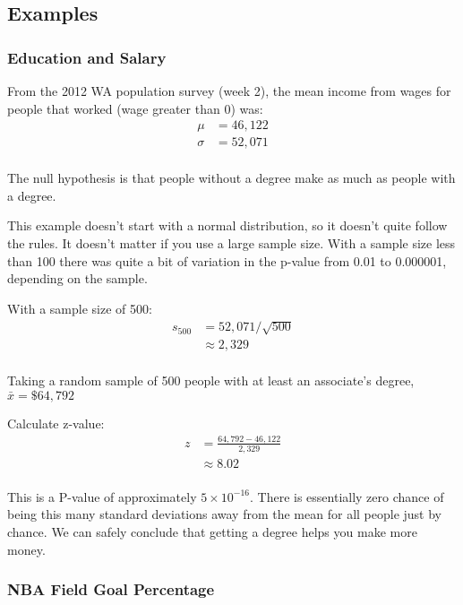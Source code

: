 \documentclass[letterpaper, landscape]{exam}
\begin{document}
  \subsection{Examples}

  \subsubsection{Education and Salary}

  From the 2012 WA population survey (week 2), the mean income from wages for
  people that worked (wage greater than 0) was:
  \begin{align*}
    \mu    & = 46,122 \\
    \sigma & = 52,071 \\
  \end{align*}

  The null hypothesis is that people without a degree make as much as people
  with a degree.

  This example doesn't start with a normal distribution, so it doesn't quite
  follow the rules. It doesn't matter if you use a large sample size. With a
  sample size less than 100 there was quite a bit of variation in the p-value
  from 0.01 to 0.000001, depending on the sample.

  With a sample size of 500:
  \begin{align*}
    s_{500} & = 52,071 / \sqrt{500} \\
                     & \approx 2,329 \\
  \end{align*}

  Taking a random sample of 500 people with at least an associate's degree, 
  $\bar{x} = \$64,792$

  Calculate z-value:
  \begin{align*}
    z & = \frac{64,792 - 46,122}{2,329} \\
      & \approx 8.02 \\
  \end{align*}

  This is a P-value of approximately $5 \times 10^{-16}$. There is essentially
  zero chance of being this many standard deviations away from the mean for all
  people just by chance. We can safely conclude that getting a degree helps you
  make more money.

  \subsubsection{NBA Field Goal Percentage}
\end{document}
